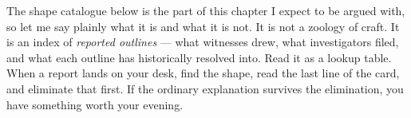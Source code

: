 
The shape catalogue below is the part of this chapter I expect to be argued
with, so let me say plainly what it is and what it is not. It is not a
zoology of craft. It is an index of \emph{reported outlines} --- what witnesses
drew, what investigators filed, and what each outline has historically
resolved into. Read it as a lookup table. When a report lands on your desk,
find the shape, read the last line of the card, and eliminate that first. If
the ordinary explanation survives the elimination, you have something worth
your evening.

\earthfieldon
\rosterwidethree

